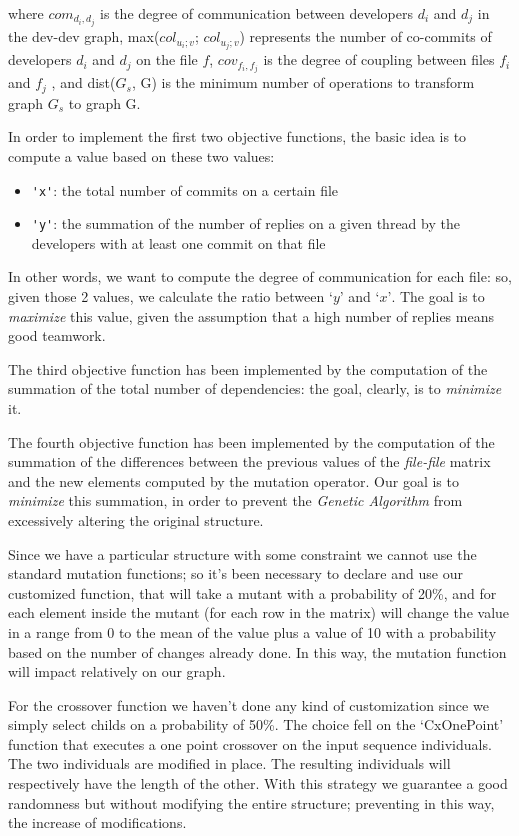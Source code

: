 \documentclass[sigconf]{acmart}
\begin{document}
where $com_{d_i,d_j}$ is the degree of communication between developers $d_i$ and $d_j$ in the dev-dev graph, max($col_{u_i;v}$; $col_{u_j;v}$) represents the number of co-commits of developers $d_i$ and $d_j$ on the file $f$, $cov_{f_i,f_j}$ is the degree of coupling between files $f_i$ and $f_j$ , and dist($G_s$, G) is the minimum number of operations to transform graph $G_s$ to graph G.

In order to implement the first two objective functions, the basic idea is to compute a value based on these two values:

\begin{itemize}
\item {\verb|'x'|}: the total number of commits on a certain file
\item {\verb|'y'|}: the summation of the number of replies on a given thread by the developers with at least one commit on that file
\end{itemize}

In other words, we want to compute the degree of communication for each file: so, given those 2 values, we calculate the ratio between $‘y’$ and $‘x’$.
The goal is to \textit{maximize} this value, given the assumption that a high number of replies means good teamwork.

The third objective function has been implemented by the computation of the summation of the total number of dependencies: the goal, clearly, is to \textit{minimize} it.

The fourth objective function has been implemented by the computation of the summation of the differences between the previous values of the {\itshape file-file} matrix and the new elements computed by the mutation operator. Our goal is to \textit{minimize} this summation, in order to prevent the {\itshape Genetic Algorithm} from excessively altering the original structure.

Since we have a particular structure with some constraint we cannot use the standard mutation functions; so it’s been necessary to declare and use our customized function, that will take a mutant with a probability of 20\%, and for each element inside the mutant (for each row in the matrix) will change the value in a range from 0 to the mean of the value plus a value of 10 with a probability based on the number of changes already done.
In this way, the mutation function will impact relatively on our graph.

For the crossover function we haven’t done any kind of customization since we simply select childs on a probability of 50\%. The choice fell on the ‘CxOnePoint’ function that executes a one point crossover on the input sequence individuals. The two individuals are modified in place. The resulting individuals will respectively have the length of the other. With this strategy we guarantee a good randomness but without modifying the entire structure; preventing in this way, the increase of modifications.
\end{document}
